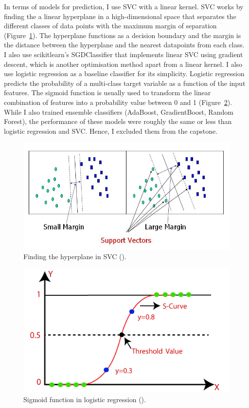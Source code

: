 In terms of models for prediction, I use SVC with a linear kernel. SVC works by finding the a linear hyperplane in a high-dimensional space that separates the different classes of data points with the maximum margin of separation (Figure~\ref{fig:svc_viz}). The hyperplane functions as a decision boundary and the margin is the distance between the hyperplane and the nearest datapoints from each class. I also use scikitlearn's SGDClassifier that implements linear SVC using gradient descent, which is another optimisation method apart from a linear kernel. I also use logistic regression as a baseline classifier for its simplicity. Logistic regression predicts the probability of a multi-class target variable as a function of the input features. The sigmoid function is usually used to transform the linear combination of features into a probability value between 0 and 1 (Figure~\ref{fig:log_reg_viz}). While I also trained ensemble classifiers (AdaBoost, GradientBoost, Random Forest), the performance of these models were roughly the same or less than logistic regression and SVC. Hence, I excluded them from the capstone.


\begin{figure}[!ht]
	\centering
	\includegraphics[width=1\linewidth]{figures/svc_viz.png}
	\caption{Finding the hyperplane in SVC (\cite{svc_viz}).}   
    \label{fig:svc_viz}
\end{figure}

\begin{figure}[!ht]
	\centering
	\includegraphics[width=1\linewidth]{figures/logistic_reg.png}
	\caption{Sigmoid function in logistic regression (\cite{log_reg_viz}).}   
    \label{fig:log_reg_viz}
\end{figure}


